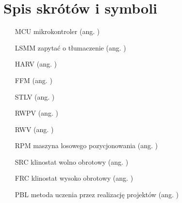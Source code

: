 \chapter*{Spis skrótów i symboli}

\begin{itemize}
	\item[MCU] mikrokontroler (ang. )
	\item[LSMM] zapytać o tłumaczenie  (ang. )
	\item[HARV]  ({ang. })
	\item[FFM]  ({ang. })
	\item[STLV]  ({ang. })
	\item[RWPV]  ({ang. })
	\item[RWV]  ({ang. })
	\item[RPM] maszyna losowego pozycjonowania ({ang. })
	\item[SRC] klinostat wolno obrotowy ({ang. })
	\item[FRC] klinostat wysoko obrotowy  ({ang. })
	\item[PBL] metoda uczenia przez realizację projektów   ({ang. })
	
\end{itemize}
